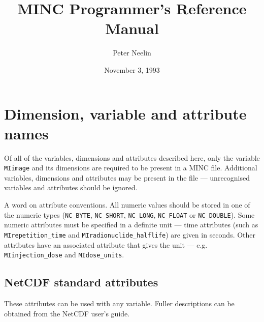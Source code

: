 %
%
\title{MINC Programmer's Reference Manual}
\author{Peter Neelin}
\date{November 3, 1993}
\textwidth 6.0in
\oddsidemargin 0.125in
\textheight 8.5in
\topmargin -0.75in
\parindent 0in



\def\code#1{{\tt #1}}

\maketitle

\tableofcontents

\clearpage

\section{Dimension, variable and attribute names}

Of all of the variables, dimensions and attributes described here, only
the variable \code{MIimage} and its dimensions are required to be
present in a MINC file. Additional variables, dimensions and
attributes may be present in the file --- unrecognised variables and
attributes should be ignored.

A word on attribute conventions. All numeric values should be stored
in one of the numeric types (\code{NC\_BYTE}, \code{NC\_SHORT},
\code{NC\_LONG}, \code{NC\_FLOAT} or \code{NC\_DOUBLE}). Some numeric
attributes must be specified in a definite unit --- time attributes
(such as \code{MIrepetition\_time} and \code{MIradionuclide\_halflife}) 
are given in seconds. Other attributes have an associated attribute that
gives the unit --- e.g. \code{MIinjection\_dose} and \code{MIdose\_units}.

\subsection{NetCDF standard attributes}

These attributes can be used with any variable. Fuller descriptions
can be obtained from the NetCDF user's guide.


